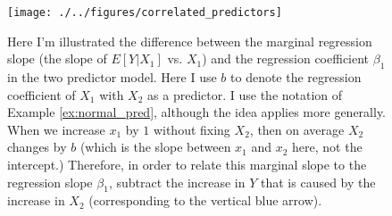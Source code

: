 \begin{figure}[h]
    \centering
    \texttt{[image: ./../figures/correlated\_predictors]}
    \caption{Here I'm illustrated the difference between the marginal regression slope (the slope of $E[Y|X_1]$ vs. $X_1$) and the regression coefficient $\beta_1$ in the two predictor model. Here I use $b$ to denote the regression coefficient of $X_1$ with $X_2$ as a predictor. I use the notation of Example \ref{ex:normal_pred}, although the idea applies more generally. When we increase $x_1$ by $1$ without fixing $X_2$, then on average $X_2$ changes by $b$ (which is the slope between $x_1$ and $x_2$ here, not the intercept.) Therefore, in order to relate this marginal slope to the regression slope $\beta_1$, subtract the increase in $Y$ that is caused by the increase in $X_2$ (corresponding to the vertical blue arrow).   }
    \label{fig:plane}
\end{figure}

